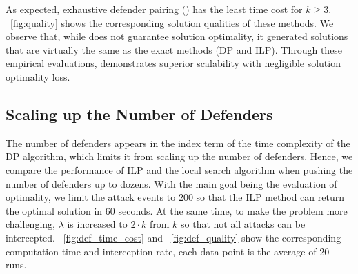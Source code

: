As expected, exhaustive defender pairing (\ours) has the least time cost for $k \geq 3$.
~\ref{fig:quality} shows the corresponding solution qualities of these methods. 
We observe that, while \ours does not guarantee solution optimality, it generated solutions that are virtually the same as the exact methods (DP and ILP). 
%
Through these empirical evaluations, \ours demonstrates superior scalability with negligible solution optimality loss. 



\subsection{Scaling up the Number of Defenders}
The number of defenders appears in the index term of the time complexity of the DP algorithm, which limits it from scaling up the number of defenders. Hence, we compare the performance of ILP and the local search algorithm when pushing the number of defenders up to dozens. With the main goal being the evaluation of optimality, we limit the attack events to $200$ so that the ILP method can return the optimal solution in $60$ seconds. At the same time, to make the problem more challenging, $\lambda$ is increased to $2\cdot k$ from $k$ so that not all attacks can be intercepted. ~\ref{fig:def_time_cost} and  ~\ref{fig:def_quality} show the corresponding computation time and interception rate, each data point is the average of 20 runs.


